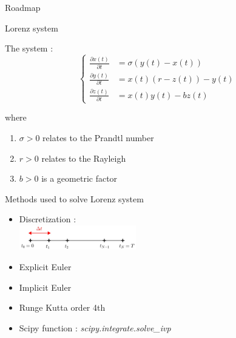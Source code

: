 \documentclass[10pt,xcolor={table,dvipsnames},t]{beamer}
\begin{document}
	\begin{frame}{Roadmap}
		
	\end{frame}
	
	
	\begin{frame}{Lorenz system}
		
		The system :
		$$\left\{\begin{aligned} 
			\frac{\partial x(t)}{\partial t} &=\sigma(y(t)-x(t))\\
			\frac{\partial y(t)}{\partial t}&=x(t)(r-z(t))-y(t) \\
			\frac{\partial z(t)}{\partial t}&=x(t)y(t)-bz(t)
		\end{aligned}\right.$$
	
		where
		
		\begin{enumerate}[\textbullet]
			\item $\sigma > 0$  relates to the Prandtl number
			\item $r > 0$  relates to the Rayleigh
			\item $b > 0$ is a geometric factor
		\end{enumerate}
		
	\end{frame}
	
	\begin{frame}{Methods used to solve Lorenz system}
		
		\begin{itemize}
			\item Discretization : \\
			\qquad \includegraphics[width=0.4\textwidth]{images/discretization.jpg} \\
			\item Explicit Euler
			\item Implicit Euler			
			\item Runge Kutta order 4th			
			\item Scipy function : \qquad \textit{scipy.integrate.solve\_ivp}
		\end{itemize}
		
	\end{frame}
	
\end{document}
